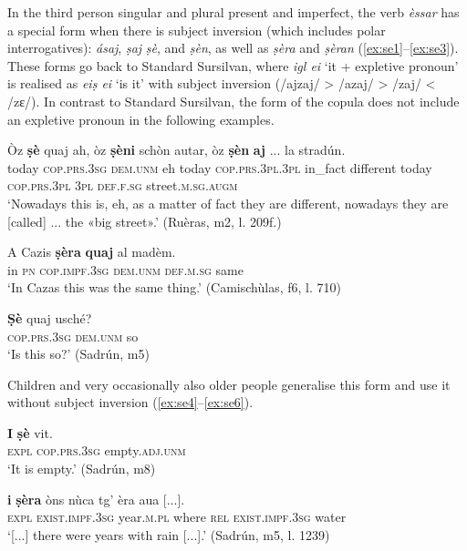 In the third person singular and plural present and imperfect, the verb \textit{èssar} has a special form when there is subject inversion (which includes polar interrogatives): \textit{ásaj}, \textit{ṣaj} \textit{ṣè}, and \textit{ṣèn}, as well as \textit{ṣèra} and \textit{ṣèran} (\ref{ex:se1}--\ref{ex:se3}). These forms go back to Standard Sursilvan, where \textit{igl ei} `it + expletive pronoun' is realised as \textit{eiṣ ei} `is it' with subject inversion (/ajzaj/ > /azaj/ > /zaj/ < /zɛ/). In contrast to Standard Sursilvan, the form of the copula does not include an expletive pronoun in the following examples.

\ea
\label{ex:se1}
\gll    Òz \textbf{ṣè} quaj ah, òz \textbf{ṣèni} schòn autar, òz \textbf{ṣèn} \textbf{aj} ... la stradún. \\
today \textsc{cop.prs.3sg} \textsc{dem.unm} eh today \textsc{cop.prs.3pl.3pl} in\_fact different today \textsc{cop.prs.3pl} \textsc{3pl} {} \textsc{def.f.sg} street.\textsc{m.sg.augm} \\
\glt `Nowadays this is, eh, as a matter of fact they are different, nowadays they are [called] ... the «big street».' (Ruèras, m2, l. 209f.)
\z

\ea
\label{ex:se2}
\gll    A Cazis \textbf{ṣèra} \textbf{quaj} al madèm.\\
in \textsc{pn} \textsc{cop.impf.3sg} \textsc{dem.unm} \textsc{def.m.sg} same\\
\glt `In Cazas this was the same thing.' (Camischùlas, f6, l. 710)
\z

\ea
\label{ex:se3}
\gll \textbf{Ṣè} quaj usché?\\
\textsc{cop.prs.3sg} \textsc{dem.unm} so\\
\glt `Is this so?' (Sadrún, m5)
\z

Children and very occasionally also older people generalise this form and use it without subject inversion (\ref{ex:se4}--\ref{ex:se6}).

\ea
\label{ex:se4}
\gll \textbf{I} \textbf{ṣè} vit.\\
\textsc{expl} \textsc{cop.prs.3sg} empty.\textsc{adj.unm}\\
\glt `It is empty.' (Sadrún, m8)
\z

\ea
\label{ex:se5}
\gll [...] \textbf{i} \textbf{ṣèra} òns nùca tg’ èra aua [...].\\
{} \textsc{expl} \textsc{exist.impf.3sg} year.\textsc{m.pl} where \textsc{rel} \textsc{exist.impf.3sg} water \\
\glt `[...] there were years with rain [...].' (Sadrún, m5, l. 1239)
\z

